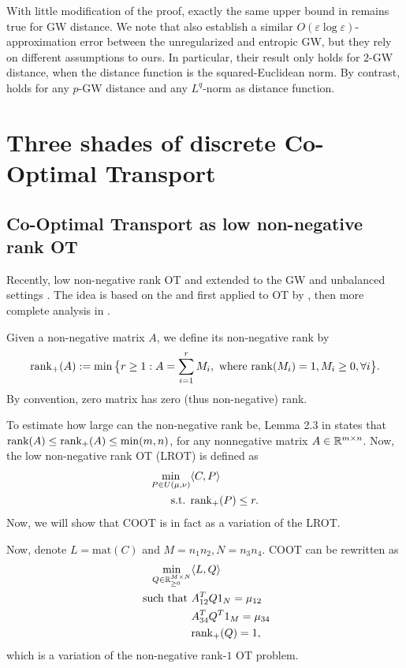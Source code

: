 With little modification of the proof, exactly the same upper bound in 
remains true for GW distance. We note that \citep{Zhang23} also establish a similar
$O(\varepsilon \log \varepsilon)$-approximation error between the unregularized and entropic GW,
but they rely on different assumptions to ours. In particular, their result only holds
for $2$-GW distance, when the distance function is the squared-Euclidean norm. By contrast,
 holds for any $p$-GW distance and any $L^q$-norm as distance function.

\section{Three shades of discrete Co-Optimal Transport}

\subsection{Co-Optimal Transport as low non-negative rank OT}

Recently, low non-negative rank OT \citep{Meyer21a} and extended to the GW and unbalanced settings
\citep{Meyer21b,Meyer23}. The idea is based on the \citep{Joel93} and first applied to OT by
\citep{Forrow18}, then more complete analysis in \citep{Meyer22}.
\begin{definition}
  Given a non-negative matrix $A$, we define its non-negative rank by
  \begin{equation}
    \text{rank}_{+}(A):= \min \big\{ r \geq 1: A = \sum_{i=1}^r M_i,
    \text{ where } \text{rank}(M_i) = 1, M_i \geq 0, \forall i \big\}.
  \end{equation}
  By convention, zero matrix has zero (thus non-negative) rank.
\end{definition}
To estimate how large can the non-negative rank be, Lemma 2.3 in \citep{Joel93} states that
$\text{rank}(A) \leq \text{rank}_+(A) \leq \min(m, n)$, for any nonnegative matrix $A \in \mathbb R^{m \times n}$.
Now, the low non-negative rank OT (LROT) is defined as
\begin{align}
  \min_{P \in U(\mu, \nu)} &\langle C, P \rangle \\
  \text{ s.t. } &\text{rank}_+(P) \leq r.
\end{align}
Now, we will show that COOT is in fact as a variation of the LROT.

Now, denote $L= \text{mat}(C)$ and $M = n_1 n_2, N = n_3 n_4$. COOT can be rewritten as
\begin{equation}
  \begin{split}
    \min_{Q \in \mathbb R^{M \times N}_{\geq 0}} &\langle L, Q \rangle \\
    \text{ such that } & A_{12}^T Q 1_N = \mu_{12} \\
    &A_{34}^T Q^T 1_M = \mu_{34} \\
    &\text{rank}_{+}(Q) = 1,
  \end{split}
\end{equation}
which is a variation of the non-negative rank-$1$ OT problem.

